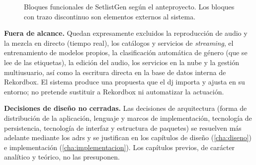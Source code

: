 \begin{figure}[htbp]
  \centering
  \shorthandoff{<>}
  \caption{Bloques funcionales de SetlistGen según el anteproyecto. Los bloques con trazo discontinuo son elementos externos al sistema.}
  \label{fig:intro-bloques}
\end{figure}


\medskip\noindent\textbf{Fuera de alcance.} Quedan expresamente excluidos la reproducción de audio y la mezcla en directo (tiempo real), los catálogos y servicios de \emph{streaming}, el entrenamiento de modelos propios, la clasificación automática de género (que se lee de las etiquetas), la edición del audio, los servicios en la nube y la gestión multiusuario, así como la escritura directa en la base de datos interna de Rekordbox. El sistema produce una propuesta que el \acs{dj} importa y ajusta en su entorno; no pretende sustituir a Rekordbox ni automatizar la actuación.

\medskip\noindent\textbf{Decisiones de diseño no cerradas.} Las decisiones de arquitectura (forma de distribución de la aplicación, lenguaje y marcos de implementación, tecnología de persistencia, tecnología de interfaz y estructura de paquetes) se resuelven más adelante mediante los \acfp{adr} y se justifican en los capítulos de diseño (\ref{cha:diseno}) e implementación (\ref{cha:implementacion}). Los capítulos previos, de carácter analítico y teórico, no las presuponen.

